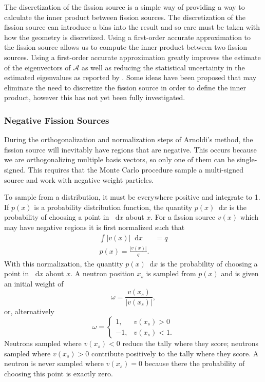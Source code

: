 \documentclass[12]{ansnse}
\newcommand{\A}{\ensuremath{\mathcal{A}}}
\newcommand{\dd}{\ensuremath{\mathop{}\!\mathrm{d}}}
\begin{document}
\begin{doublespace}
The discretization of the fission source is a simple way of providing a way to calculate the inner product between fission sources.  The discretization of the fission source can introduce a bias into the result and so care must be taken with how the geometry is discretized.  Using a first-order accurate approximation to the fission source allows us to compute the inner product between two fission sources.  Using a first-order accurate approximation greatly improves the estimate of the eigenvectors of \A{} as well as reducing the statistical uncertainty in the estimated eigenvalues as reported by \citet{Conlin:2009Secon-0}.  Some ideas have been proposed\cite{Booth:2010Exact-0} that may eliminate the need to discretize the fission source in order to define the inner product, however this has not yet been fully investigated.

\subsubsection{Negative Fission Sources}\label{sec:NegativeSources}
During the orthogonalization and normalization steps of Arnoldi's method, the fission source will inevitably have regions that are negative.  This occurs because we are orthogonalizing multiple basis vectors, so only one of them can be single-signed.  This requires that the Monte Carlo procedure sample a multi-signed source and work with negative weight particles.  

To sample from a distribution, it must be everywhere positive and integrate to 1.  If $p(x)$ is a probability distribution function, the quantity $p(x)\dd x$ is the probability of choosing a point in $\dd x$ about $x$.  For a fission source $v(x)$ which may have negative regions it is first normalized such that
\begin{subequations}\begin{align}
    \int \left|v(x)\right| \dd x &= q \\
    p(x) = \frac{\left|v(x)\right|}{q}.
    \label{eq:FissionSourceNormalization}
\end{align}\end{subequations}
With this normalization, the quantity $p(x) \dd x$ is the probability of choosing a point in $\dd x$ about $x$.  A neutron position $x_s$ is sampled from $p(x)$ and is given an initial weight of
\begin{equation}
    \omega = \frac{v(x_s)}{\left|v(x_s)\right|}, 
    \label{eq:InitialWeight}
\end{equation}
or, alternatively
\begin{equation}
    \omega = \begin{cases}
        1, & v(x_s) > 0 \\
        -1, & v(x_s) < 1.
    \end{cases}
    \label{eq:OtherInitialWeight}
\end{equation}
Neutrons sampled where \mbox{$v(x_s) < 0$} reduce the tally where they score; neutrons sampled where \mbox{$v(x_s) > 0$} contribute positively to the tally where they score.  A neutron is never sampled where \mbox{$v(x_s) = 0$} because there the probability of choosing this point is exactly zero.  


\end{doublespace}
\end{document}

